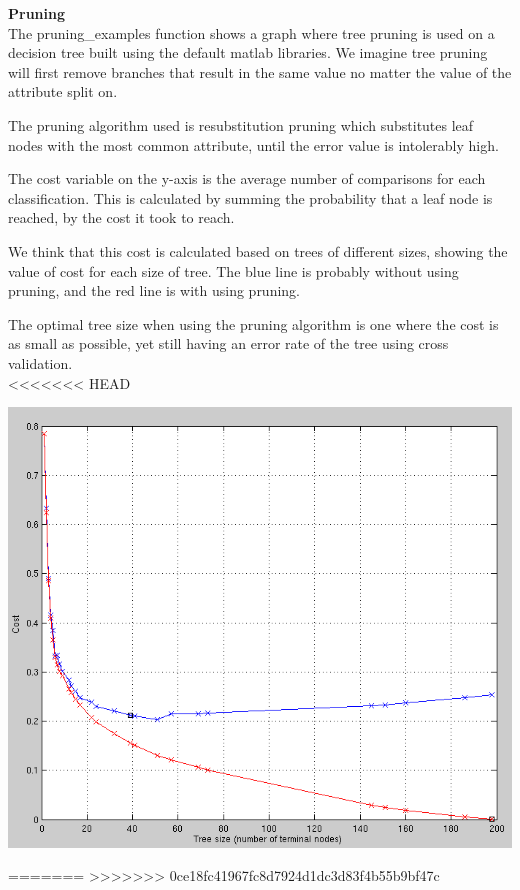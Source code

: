 \documentclass[12pt]{article}
\begin{document}
{\bf Pruning} \\
The pruning\_examples function shows a graph where tree pruning is used on a decision tree built using the default matlab libraries. We imagine tree pruning will first remove branches that result in the same value no matter the value of the attribute split on.

The pruning algorithm used is resubstitution pruning which substitutes leaf nodes with the most common attribute, until the error value is intolerably high.

The cost variable on the y-axis is the average number of comparisons for each classification. This is calculated by summing the probability that a leaf node is reached, by the cost it took to reach.

We think that this cost is calculated based on trees of different sizes, showing the value of cost for each size of tree. The blue line is probably without using pruning, and the red line is with using pruning.

The optimal tree size when using the pruning algorithm is one where the cost is as small as possible, yet still having an error rate of the tree using cross validation. \\
<<<<<<< HEAD

\begin{center}
  \includegraphics[scale=0.6]{report-images/pruning.png}
\end{center}
=======
>>>>>>> 0ce18fc41967fc8d7924d1dc3d83f4b55b9bf47c
\end{document}
